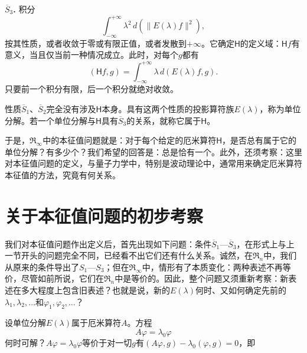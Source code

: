 \documentclass[fontsize=13pt,twoside,openany,headings=normal,parskip=false,bookmarkpackage=false,DIV=calc]{scrbook}
\begin{document}
\hypertarget{origpage-62}{}\label{origpage-62}\leavevmode{}\textbf{$\overline{S}_3$.}\label{cond:II.Sbar3} 积分
\[
\int_{-\infty}^{+\infty}\lambda^2\,d(\|E(\lambda)f\|^2),
\]
按其性质，或者收敛于零或有限正值，或者发散到$+\infty$。它确定$\mathsf H$的定义域：$\mathsf Hf$有意义，当且仅当前一种情况成立。此时，对每个$g$都有
\[
(\mathsf Hf,g)=\int_{-\infty}^{+\infty}\lambda\,d(E(\lambda)f,g).
\]
只要前一个积分有限，后一个积分就绝对收敛。

性质$\hyperref[cond:II.Sbar1]{\overline{S}_1}$、$\hyperref[cond:II.Sbar2]{\overline{S}_2}$完全没有涉及$\mathsf H$本身。具有这两个性质的投影算符族$E(\lambda)$，称为单位分解。若一个单位分解与$\mathsf H$具有$\hyperref[cond:II.Sbar3]{\overline{S}_3}$的关系，就称它属于$\mathsf H$。

于是，$\mathfrak{R}_\infty$中的本征值问题就是：对于每个给定的厄米算符$\mathsf H$，是否总有属于它的单位分解？有多少个？我们希望的回答是：总是恰有一个。此外，还须考察：这里对本征值问题的定义，与量子力学中，特别是波动理论中，通常用来确定厄米算符本征值的方法，究竟有何关系。

\section{关于本征值问题的初步考察}\label{sec:II.8}
我们对本征值问题作出定义后，首先出现如下问题：条件$\hyperref[cond:II.Sbar1]{\overline{S}_1}$—$\hyperref[cond:II.Sbar3]{\overline{S}_3}$，在形式上与上一节开头的问题完全不同，已经看不出它们还有什么关系。诚然，在$\mathfrak{R}_n$中，我们从原来的条件导出了$\hyperref[cond:II.S1]{S_1}$—$\hyperref[cond:II.S3]{S_3}$；但在$\mathfrak{R}_\infty$中，情形有了本质变化：两种表述不再等价，尽管如前所说，它们在$\mathfrak{R}_n$中是等价的。因此，整个问题又须重新考察：新表述在多大程度上包含旧表述？也就是说，新的$E(\lambda)$何时、又如何确定先前的$\lambda_1,\allowbreak \lambda_2,\allowbreak \ldots$和$\varphi_1,\allowbreak \varphi_2,\allowbreak \ldots$？

设单位分解$E(\lambda)$属于厄米算符$A$。方程
\[
A\varphi=\lambda_0\varphi
\]
何时可解？$A\varphi=\lambda_0\varphi$等价于对一切$g$有$(A\varphi,\allowbreak g)-\lambda_0(\varphi,\allowbreak g)=0$，即
\end{document}
